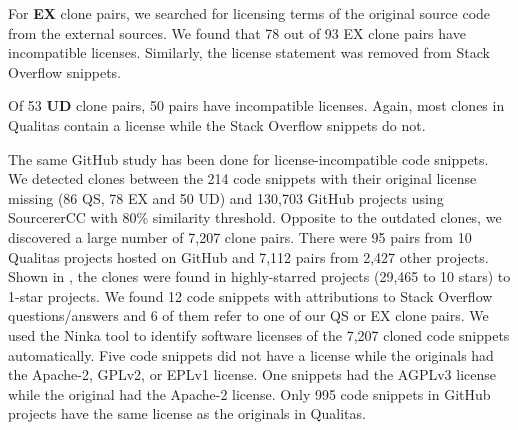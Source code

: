 \documentclass[10pt,journal,compsoc]{IEEEtran}
\begin{document}
For \textbf{EX}
clone pairs, we searched for licensing terms of the original source code from
the external sources. We found that 78 out of 93 EX clone pairs have
incompatible licenses. %
Similarly, the license statement was removed from Stack Overflow snippets. 

Of 53 \textbf{UD} clone pairs, 50 pairs have incompatible licenses. Again, most
clones in Qualitas contain a license while the Stack Overflow snippets do not.
%

The same GitHub study has been done for license-incompatible code snippets. 
We detected clones between the 214
code snippets with their original license missing (86 QS, 78 EX and 50 UD)  and
130,703 GitHub projects using SourcererCC with 80\% similarity threshold.
Opposite to the outdated clones, we discovered a large number
of 7,207 clone pairs. There were 95 pairs from 10 Qualitas projects hosted on
GitHub and 7,112 pairs from 2,427 other projects. Shown in
, the clones were found in highly-starred
projects (29,465 to 10 stars) to 1-star projects.
We found 12 code snippets with attributions to Stack Overflow questions/answers and
6 of them refer to one of our QS or EX clone pairs.
We used the Ninka tool to identify software licenses of the 7,207 cloned
code snippets automatically. 
Five code snippets did not have a license while the originals had the Apache-2, GPLv2,
or EPLv1 license. One snippets had the AGPLv3 license while the original had the Apache-2 license.
Only 995 code snippets in GitHub projects have the same license
as the originals in Qualitas.
\end{document}

